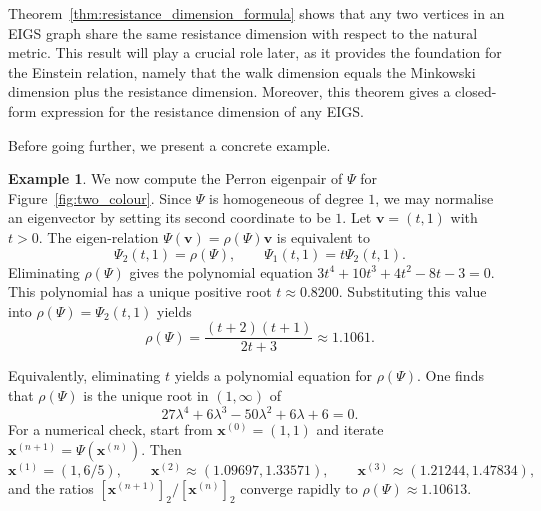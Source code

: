 \documentclass{article}
\theoremstyle{plain}
\theoremstyle{definition}
\newtheorem{example}[theorem]{Example}
\begin{document}
Theorem~\ref{thm:resistance_dimension_formula} shows that any two vertices in an EIGS graph share the same resistance dimension with respect to the natural metric.
This result will play a crucial role later, as it provides the foundation for the Einstein relation, namely that the walk dimension equals the Minkowski dimension plus the resistance dimension.
Moreover, this theorem gives a closed-form expression for the resistance dimension of any EIGS.

Before going further, we present a concrete example.

\begin{example}\label{example:two_colour_1}
We now compute the Perron eigenpair of $\Psi$ for Figure~\ref{fig:two_colour}$.$
Since $\Psi$ is homogeneous of degree $1$, we may normalise an eigenvector by setting its second coordinate to be $1$.
Let $\mathbf v=(t,1)$ with $t>0$.
The eigen-relation $\Psi(\mathbf v)=\rho(\Psi)\mathbf v$ is equivalent to
\[
\Psi_2(t,1)=\rho(\Psi),
\qquad
\Psi_1(t,1)=t\Psi_2(t,1).
\]
Eliminating $\rho(\Psi)$ gives the polynomial equation
$
3t^4+10t^3+4t^2-8t-3=0.
$
This polynomial has a unique positive root
$
t\approx 0.8200.
$
Substituting this value into $\rho(\Psi)=\Psi_2(t,1)$ yields
\[
\rho(\Psi)
=
\frac{(t+2)(t+1)}{2t+3}
\approx
1.1061.
\]

Equivalently, eliminating $t$ yields a polynomial equation for $\rho(\Psi)$.
One finds that $\rho(\Psi)$ is the unique root in $(1,\infty)$ of
\[
27\lambda^4+6\lambda^3-50\lambda^2+6\lambda+6=0.
\]
For a numerical check, start from $\mathbf x^{(0)}=(1,1)$ and iterate $\mathbf x^{(n+1)}=\Psi(\mathbf x^{(n)})$.
Then
\[
\mathbf x^{(1)}=(1,6/5),
\qquad
\mathbf x^{(2)}\approx (1.09697,1.33571),
\qquad
\mathbf x^{(3)}\approx (1.21244,1.47834),
\]
and the ratios $[\mathbf x^{(n+1)}]_2/[\mathbf x^{(n)}]_2$ converge rapidly to $\rho(\Psi)\approx 1.10613$.


\end{example}
\end{document}
